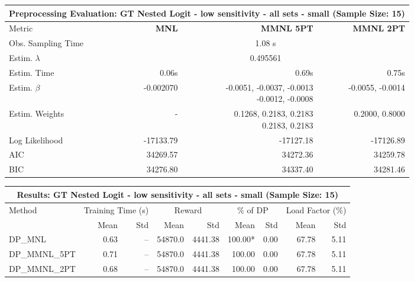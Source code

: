 
\begin{samepage}
\begin{center}
  \small
  \begin{tabular}{l|r|r|r}
    \toprule
    \multicolumn{4}{c}{\textbf{Preprocessing Evaluation: GT Nested Logit - low sensitivity - all sets - small (Sample Size: 15)}} \\
    \midrule
    Metric & \textbf{MNL} & \textbf{MMNL 5PT} & \textbf{MMNL 2PT} \\
    \midrule
    Obs. Sampling Time & \multicolumn{3}{c}{1.08 s} \\
    Estim. $\lambda$ & \multicolumn{3}{c}{0.495561} \\
    Estim. Time & 0.06s & 0.69s & 0.75s \\
    Estim. $\beta$ & -0.002070 & \makecell[tr]{-0.0051, -0.0037, -0.0013 \\ -0.0012, -0.0008} & -0.0055, -0.0014 \\
    Estim. Weights & - & \makecell[tr]{0.1268, 0.2183, 0.2183 \\ 0.2183, 0.2183} & 0.2000, 0.8000 \\
    Log Likelihood & -17133.79 & -17127.18 & -17126.89 \\
    AIC & 34269.57 & 34272.36 & 34259.78 \\
    BIC & 34276.80 & 34337.40 & 34281.46 \\
    \bottomrule
  \end{tabular}
\end{center}
\begin{center}
  \small
  \begin{tabular}{l|rr|rr|rr|rr}
    \toprule
    \multicolumn{9}{c}{\textbf{Results: GT Nested Logit - low sensitivity - all sets - small (Sample Size: 15)}} \\
    \midrule
    Method & \multicolumn{2}{c|}{Training Time (s)} & \multicolumn{2}{c|}{Reward} & \multicolumn{2}{c|}{\% of DP} & \multicolumn{2}{c}{Load Factor (\%)} \\
    & Mean & Std & Mean & Std & Mean & Std & Mean & Std \\
    \midrule
    DP\_MNL      &     0.63 &    -- &    54870.0 &    4441.38 & 100.00* &    0.00 &   67.78 &    5.11 \\
    DP\_MMNL\_5PT &     0.71 &    -- &    54870.0 &    4441.38 &  100.00 &    0.00 &   67.78 &    5.11 \\
    DP\_MMNL\_2PT &     0.68 &    -- &    54870.0 &    4441.38 &  100.00 &    0.00 &   67.78 &    5.11 \\

\end{tabular}
\end{center}
\end{samepage}
